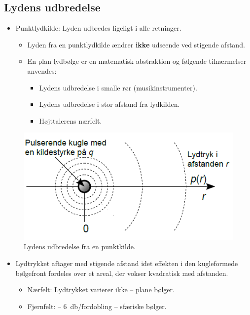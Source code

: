 \subsection{Lydens udbredelse}

\begin{itemize}
	\item Punktlydkilde: Lyden udbredes ligeligt i alle retninger.
	\begin{itemize}
		\item Lyden fra en punktlydkilde ændrer \textbf{ikke} udseende ved stigende afstand.
		\item En plan lydbølge er en matematisk abstraktion og følgende tilnærmelser anvendes:
		\begin{itemize}
			\item Lydens udbredelse i smalle rør (musikinstrumenter).
			\item Lydens udbredelse i stor afstand fra lydkilden.
			\item Højttalerens nærfelt.
		\end{itemize}
	\end{itemize}
\end{itemize}

\begin{figure} [H]
	\centering
	\includegraphics[width=0.5\linewidth]{graphics/9.png}
	\caption{Lydens udbredelse fra en punktkilde.}
	\label{fig:9}
\end{figure}

\begin{itemize}
	\item Lydtrykket aftager med stigende afstand idet effekten i den kugleformede bølgefront fordeles over et areal, der vokser kvadratisk med afstanden.
	\begin{itemize}
		\item Nærfelt: Lydtrykket varierer ikke – plane bølger.
		\item Fjernfelt: – \SI{6}{\decibel}/fordobling – sfæriske bølger.
	\end{itemize}
\end{itemize}

